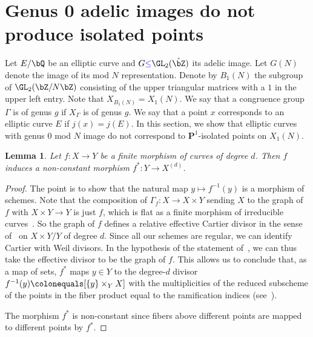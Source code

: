 \documentclass[11pt,reqno]{amsart}
\theoremstyle{plain}
\newtheorem{lemma}[theorem]{Lemma}
\theoremstyle{definition}
\newcommand{\Q}{\bQ}
\newcommand{\Z}{\bZ}
\newcommand{\PP}{\mathbf P}
\newcommand{\filip}[1]{{\textcolor{cyan}{Filip: [#1]}}}
\newcommand{\sachi}[1]{\textcolor{purple}{Sachi: #1}}
\newcommand{\abedit}[1]{{\color{blue} #1}}
\begin{document}
\section{Genus 0 adelic images do not produce isolated points}
\label{sec:genus0images}


\label{sec:genus0}
Let $E/\Q$ be an elliptic curve and $G\abedit{\leq} \GL_2(\hat \Z)$ its adelic image. Let $G(N)$ denote the image of its mod $N$ representation. Denote by $B_1(N)$ the subgroup of $\GL_2(\Z/N\Z)$ consisting of the upper triangular matrices with a $1$ in the upper left entry. Note that $X_{B_1(N)}=X_1(N)$. We say that a congruence group $\Gamma$ is of genus $g$ if $X_\Gamma$ is of genus $g$. We say that a point \abedit{$x$} corresponds to an elliptic curve $E$ if \abedit{$j(x) = j(E)$}. In this section, we show that elliptic curves with genus $0$ mod $N$ image  do not correspond to $\PP^1$-isolated points on $X_1(N)$.


\begin{lemma} \label{lem:map to Symd}
Let $f\colon X \to Y$ be a finite morphism of curves of degree $d$. Then $f$ induces a non-constant morphism $f^*\colon Y \to X^{(d)}$.
\end{lemma}
\begin{proof}
    The point is to show that the natural map $y \mapsto f^{-1}(y)$ is a morphism of schemes.  Note that the composition of $\Gamma_f\colon X \to X \times Y$ sending $X$ to the graph of $f$ with $X \times Y \to Y$ is just $f$, which is flat as a finite morphism of irreducible curves~\cite[Proposition~4.3.9]{Liu2002}. So the graph of $f$ defines a relative effective Cartier divisor in the sense of~\cite[Definition~3.4]{MilneJV} on $X \times Y/Y$ of degree $d$.
    Since all our schemes are regular, we can identify Cartier with Weil divisors. 
    In the hypothesis of the statement of~\cite[Theorem~3.13]{MilneJV}, we can thus take the effective divisor to be the graph of $f$. This allows us to conclude that, as a map of sets, $f^*$ maps $y \in Y$ to the degree-$d$ divisor $f^{-1}(y) \colonequals [\{y\} \times_Y X]$ with the multiplicities of the reduced subscheme of the points in the fiber product equal to the ramification indices (see~\cite[\S\,1.5, \S\,1.7]{FultonIntersectionTheory}).
     
    The morphism $f^*$ is non-constant since fibers above different points are mapped to different points by $f^*$.
\end{proof}


\end{document}
